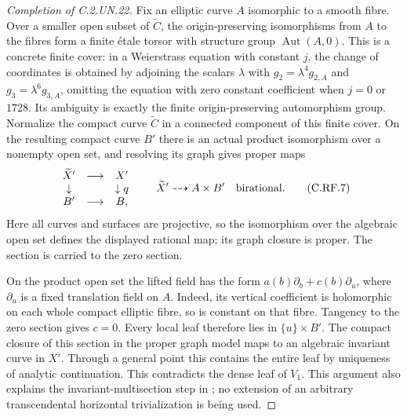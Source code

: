 \begin{proof}[Completion of C.2.UN.22]
Fix an elliptic curve $A$ isomorphic to a smooth fibre.
Over a smaller open subset of $\widetilde C$, the
origin-preserving isomorphisms from $A$ to the fibres
form a finite \'etale torsor with structure group
$\operatorname{Aut}(A,0)$. This is a concrete finite
cover: in a Weierstrass equation with constant $j$, the
change of coordinates is obtained by adjoining the
scalars $\lambda$ with
$g_2=\lambda^4g_{2,A}$ and
$g_3=\lambda^6g_{3,A}$, omitting the equation with
zero constant coefficient when $j=0$ or $1728$.
Its ambiguity is exactly the finite origin-preserving
automorphism group. Normalize the compact curve
$\widetilde C$ in a connected component of this finite
cover. On the resulting compact curve $B'$ there is
an actual product isomorphism over a nonempty open set,
and resolving its graph gives proper maps
\[
 \begin{array}{ccc}
 \widetilde X'&\longrightarrow&X'\\
 \downarrow&&\downarrow q\\
 B'&\longrightarrow&B,
 \end{array}
 \qquad
 \widetilde X'\dashrightarrow A\times B'
 \quad\hbox{birational}.
                                                               \tag{C.RF.7}
\]
Here all curves and surfaces are projective, so the
isomorphism over the algebraic open set defines the
displayed rational map; its graph closure is proper.
The section is carried to the zero section.

On the product open set the lifted field has the form
$a(b)\partial_b+c(b)\partial_u$, where $\partial_u$
is a fixed translation field on $A$. Indeed, its vertical
coefficient is holomorphic on each whole compact elliptic
fibre, so is constant on that fibre. Tangency to the zero
section gives $c=0$. Every local leaf therefore lies in
$\{u\}\times B'$. The compact closure of this section
in the proper graph model maps to an algebraic invariant
curve in $X'$. Through a general point this contains
the entire leaf by uniqueness of analytic continuation.
This contradicts the dense leaf of $V_1$. This argument
also explains the invariant-multisection step in
\cite[\S6.3]{Guillot2019}; no extension of an arbitrary
transcendental horizontal trivialization is being used.


\end{proof}
